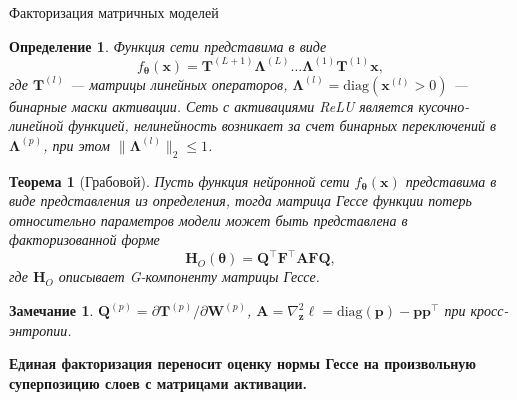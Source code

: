 \documentclass[9pt,pdf,hyperref={unicode}]{beamer}
\newtheorem{rustheorem}{Теорема}
\newtheorem{rusdefinition}{Определение}
\newtheorem{rusremark}{Замечание}
\newcommand{\key}[1]{\par\vspace{0.5ex}\noindent\textbf{\color{darkgreen}#1}}
\begin{document}
\begin{frame}{Факторизация матричных моделей}
\justifying
\small
\begin{rusdefinition}
    Функция сети представима в виде
    \[
        f_{\boldsymbol{\theta}}(\mathbf{x}) = \mathbf{T}^{(L+1)}\boldsymbol{\Lambda}^{(L)}\dots \boldsymbol{\Lambda}^{(1)}\mathbf{T}^{(1)}\mathbf{x},
    \]
    где $\mathbf{T}^{(l)}$ --- матрицы линейных операторов, $\boldsymbol{\Lambda}^{(l)}=\mathrm{diag}(\mathbf{x}^{(l)}>0)$ --- бинарные маски активации. Сеть с активациями ReLU является кусочно-линейной функцией, нелинейность возникает за счет бинарных переключений в $\boldsymbol{\Lambda}^{(p)}$, при этом $\|\boldsymbol{\Lambda}^{(l)}\|_2\le1$.
\end{rusdefinition}
\begin{rustheorem}[Грабовой]
    Пусть функция нейронной сети $f_{\boldsymbol{\theta}}(\mathbf{x})$ представима в виде представления из определения, тогда матрица Гессе функции потерь относительно параметров модели может быть представлена в факторизованной форме
    \[
        \mathbf{H}_O(\boldsymbol{\theta})=\mathbf{Q}^{\top}\mathbf{F}^{\top}\mathbf{A}\mathbf{F}\mathbf{Q},
    \]
    где $\mathbf{H}_O$ описывает G-компоненту матрицы Гессе.
\end{rustheorem}
\begin{rusremark}
    $\mathbf{Q}^{(p)}=\partial\mathbf{T}^{(p)}/\partial\mathbf{W}^{(p)}$, $\mathbf{A}=\nabla^2_{\mathbf{z}}\ell=\mathrm{diag}(\mathbf{p})-\mathbf{p}\mathbf{p}^{\top}$ при кросс-энтропии.
\end{rusremark}
\key{Единая факторизация переносит оценку нормы Гессе на произвольную суперпозицию слоев с матрицами активации.}
\end{frame}
\end{document}
